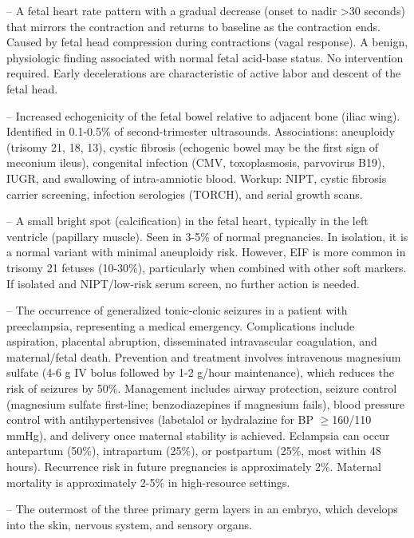-- A fetal heart rate pattern with a gradual decrease (onset to nadir >30 seconds) that mirrors the contraction and returns to baseline as the contraction ends. Caused by fetal head compression during contractions (vagal response). A benign, physiologic finding associated with normal fetal acid-base status. No intervention required. Early decelerations are characteristic of active labor and descent of the fetal head.

-- Increased echogenicity of the fetal bowel relative to adjacent bone (iliac wing). Identified in 0.1-0.5\% of second-trimester ultrasounds. Associations: aneuploidy (trisomy 21, 18, 13), cystic fibrosis (echogenic bowel may be the first sign of meconium ileus), congenital infection (CMV, toxoplasmosis, parvovirus B19), IUGR, and swallowing of intra-amniotic blood. Workup: NIPT, cystic fibrosis carrier screening, infection serologies (TORCH), and serial growth scans.

-- A small bright spot (calcification) in the fetal heart, typically in the left ventricle (papillary muscle). Seen in 3-5\% of normal pregnancies. In isolation, it is a normal variant with minimal aneuploidy risk. However, EIF is more common in trisomy 21 fetuses (10-30\%), particularly when combined with other soft markers. If isolated and NIPT/low-risk serum screen, no further action is needed.

-- The occurrence of generalized tonic-clonic seizures in a patient with preeclampsia, representing a medical emergency. Complications include aspiration, placental abruption, disseminated intravascular coagulation, and maternal/fetal death. Prevention and treatment involves intravenous magnesium sulfate (4-6 g IV bolus followed by 1-2 g/hour maintenance), which reduces the risk of seizures by 50\%. Management includes airway protection, seizure control (magnesium sulfate first-line; benzodiazepines if magnesium fails), blood pressure control with antihypertensives (labetalol or hydralazine for BP \(\ge\)160/110 mmHg), and delivery once maternal stability is achieved. Eclampsia can occur antepartum (50\%), intrapartum (25\%), or postpartum (25\%, most within 48 hours). Recurrence risk in future pregnancies is approximately 2\%. Maternal mortality is approximately 2-5\% in high-resource settings.

-- The outermost of the three primary germ layers in an embryo, which develops into the skin, nervous system, and sensory organs.

